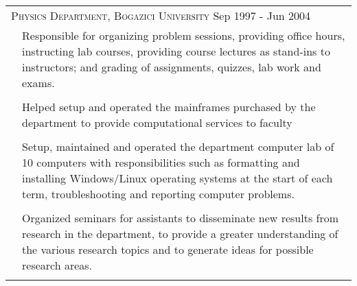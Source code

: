 \documentclass[a4paper,10pt]{article}
\newcommand{\exptitle}[2]{
  \multicolumn{2}{l}{\textsc{#1} \footnotesize{#2}} \\
  \specialrule{.01em}{0.5em}{1em}
}
\begin{document}
\begin{longtable}{r|p{11cm}}
  \exptitle{Physics Department, Bogazici University}{Sep 1997 - Jun 2004}


                                & Responsible for organizing problem sessions, providing office hours, instructing lab courses, providing course lectures as stand-ins to instructors; and grading of assignments, quizzes, lab work and exams. \\
  \multicolumn{2}{c}{} \\

                                & Helped setup and operated the mainframes purchased by the department to provide computational services to faculty \\
  \multicolumn{2}{c}{} \\
                                & Setup, maintained and operated the department computer lab of 10 computers with responsibilities such as formatting and installing Windows/Linux operating systems at the start of each term, troubleshooting and reporting computer problems. \\
  \multicolumn{2}{c}{} \\
                                & Organized seminars for assistants to disseminate new results from research in the department, to provide a greater understanding of the various research topics and to generate ideas for possible research areas. \\
  \multicolumn{2}{c}{} \\


\end{longtable}

\end{document}
